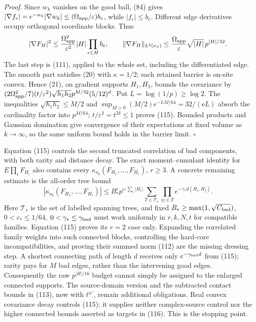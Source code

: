 \documentclass[11pt,a4paper]{article}
\begin{document}
\emph{Proof.} Since \(w_k\) vanishes on the good ball, (84) gives
\(|\nabla f_e|=e^{-w_k}|\nabla w_k| \le(\Omega_{\rm app}/\varepsilon)b_e\),
while \(|f_e|\le b_e\). Different edge derivatives occupy orthogonal
coordinate blocks. Thus \[|\nabla F_H|^2\le
\frac{\Omega_{\rm app}^2}{\varepsilon^2}|H|\prod_{e\in H}b_e,
\qquad
\|\nabla F_H\|_{L^2(\nu_J)}
\le\frac{\Omega_{\rm app}}{\varepsilon}\sqrt{|H|}\,p^{|H|/32}.\] The
last step is (111), applied to the whole set, including the
differentiated edge. The smooth part satisfies (20) with \(\kappa=1/2\);
each retained barrier is on-site convex. Hence (21), on gradient
supports \(H_1,H_2\), bounds the covariance by
\((2\Omega_{\rm app}^2/7)(t/\varepsilon^2)\sqrt{h_1h_2} p^{M/32}(5/12)^d\).
Put \(L=\log(1/p)\ge\log2\). The inequalities \(\sqrt{h_1h_2}\le M/2\)
and \(\sup_{M>0}(M/2)e^{-LM/64}=32/(\mathrm eL)\) absorb the cardinality
factor into \(p^{M/64}\); \(t/\varepsilon^2=t^{2\delta}\le1\) proves
(115). Bounded products and Gaussian domination give convergence of
their expectations at fixed volume as \(k\to\infty\), so the same
uniform bound holds in the barrier limit. \(\square\)

Equation (115) controls the second truncated correlation of bad
components, with both rarity and distance decay. The exact
moment--cumulant identity for \(E\prod_iF_{H_i}\) also contains every
\(\kappa_{\nu_0}(F_{H_1},\ldots,F_{H_r})\), \(r\ge3\). A concrete
remaining estimate is the all-order tree bound
\[|\kappa_{\nu_0}(F_{H_1},\ldots,F_{H_r})|
\le B_*^r p^{c_*\sum_i|H_i|}
\sum_{T\in\mathcal T_r}\prod_{ij\in T}e^{-\gamma_*d(H_i,H_j)}.
\tag{116}\] Here \(\mathcal T_r\) is the set of labelled spanning trees,
and fixed \(B_*\ge\max(1,\sqrt{C_{\rm bad}})\), \(0<c_*\le1/64\),
\(0<\gamma_*\le\gamma_{\rm bad}\) must work uniformly in \(r,k,N,t\) for
compatible families. Equation (115) proves its \(r=2\) case only.
Expanding the correlated family weights into such connected blocks,
controlling the hard-core incompatibilities, and proving their summed
norm (112) are the missing dressing step. A shortest connecting path of
length \(d\) receives only \(e^{-\gamma_{\rm bad}d}\) from (115); rarity
pays for \(M\) bad edges, rather than the intervening good edges.
Consequently the raw \(p^{|H|/16}\) budget cannot simply be assigned to
the enlarged connected supports. The source-domain version and the
subtracted contact bounds in (113), now with \(t^{\alpha'}\), remain
additional obligations. Real convex covariance decay controls (115); it
supplies neither complex-source control nor the higher connected bounds
asserted as targets in (116). This is the stopping point.
\end{document}
